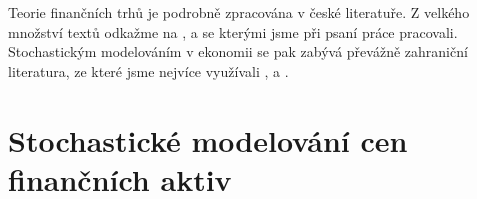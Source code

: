\documentclass[a4paper,12pt]{report}
\theoremstyle{definition} \newtheorem{definice}[veta]{Definice}
\theoremstyle{remark}
\begin{document}
Teorie finančních trhů je podrobně zpracována v české literatuře.
Z velkého množství textů odkažme na \cite{rejnus2011}, \cite{fuchsfinancni} a \cite{veselainvestovani} se kterými jsme při psaní práce pracovali.
Stochastickým modelováním v ekonomii se pak zabývá převážně zahraniční literatura, ze které jsme nejvíce využívali \cite{hull}, \cite{wilmott1995mathematics} a \cite{karatzas1998methods}.

\section{Stochastické modelování cen finančních aktiv}



\end{document}
